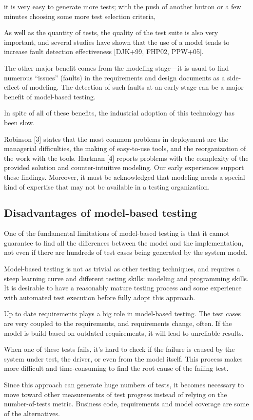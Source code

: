  it is very easy to generate more tests; with the push of another button or a few minutes choosing some more test selection criteria,

As well as the quantity of tests, the quality of the test suite is also very important, and several studies have shown that the use of a model tends to increase fault detection effectiveness [DJK+99, FHP02, PPW+05].

The other major benefit comes from the modeling stage—it is usual to find numerous “issues” (faults) in the requirements and design documents as a side-effect of modeling. The detection of such faults at an early stage can be a major benefit of model-based testing.

In spite of all of these benefits, the industrial adoption of this technology has been slow.

Robinson [3] states that the most common problems in deployment are the managerial difficulties, the making of easy-to-use tools, and the reorganization of the work with the tools. Hartman [4] reports problems with the complexity of the provided solution and counter-intuitive modeling. Our early experiences support these findings. Moreover, it must be acknowledged that modeling needs a special kind of expertise that may not be available in a testing organization. 

\subsection{Disadvantages of model-based testing}
One of the fundamental limitations of model-based testing is that it cannot guarantee to find all the differences between the model and the implementation, not even if there are hundreds of test cases being generated by the system model.

Model-based testing is not as trivial as other testing techniques, and requires a steep learning curve and different testing skills: modeling and programming skills. It is desirable to have a reasonably mature testing process and some experience with automated test execution before fully adopt this approach.

Up to date requirements plays a big role in model-based testing. The test cases are very coupled to the requirements, and requirements change, often. If the model is build based on outdated requirements, it will lead to unreliable results.

When one of these tests fails, it's hard to check if the failure is caused by the system under test, the driver, or even from the model itself. This process makes more difficult and time-consuming to find the root cause of the failing test.

Since this approach can generate huge numbers of tests, it becomes necessary to move toward other measurements of test progress instead of relying on the number-of-tests metric. Business code, requirements and model coverage are some of the alternatives.

